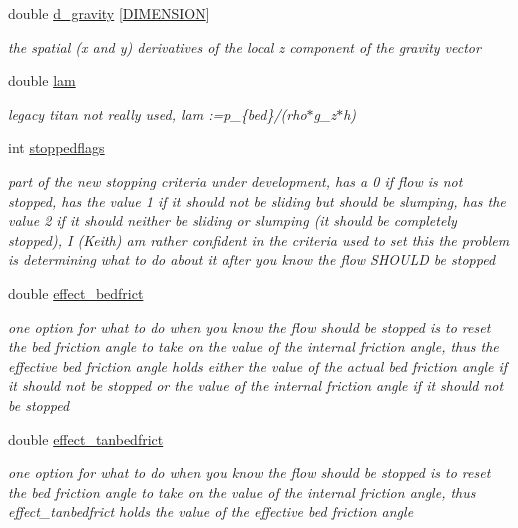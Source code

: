 \begin{CompactItemize}
double \hyperlink{classElement_r41}{d\_\-gravity} \mbox{[}\hyperlink{constant_8h_a15}{DIMENSION}\mbox{]}
\begin{CompactList}\small\item\em the spatial (x and y) derivatives of the local z component of the gravity vector \item\end{CompactList}\item 
double \hyperlink{classElement_r42}{lam}
\begin{CompactList}\small\item\em legacy titan not really used, lam :=p\_\-\{bed\}/(rho$\ast$g\_\-z$\ast$h) \item\end{CompactList}\item 
int \hyperlink{classElement_r43}{stoppedflags}
\begin{CompactList}\small\item\em part of the new stopping criteria under development, has a 0 if flow is not stopped, has the value 1 if it should not be sliding but should be slumping, has the value 2 if it should neither be sliding or slumping (it should be completely stopped), I (Keith) am rather confident in the criteria used to set this the problem is determining what to do about it after you know the flow SHOULD be stopped \item\end{CompactList}\item 
double \hyperlink{classElement_r44}{effect\_\-bedfrict}
\begin{CompactList}\small\item\em one option for what to do when you know the flow should be stopped is to reset the bed friction angle to take on the value of the internal friction angle, thus the effective bed friction angle holds either the value of the actual bed friction angle if it should not be stopped or the value of the internal friction angle if it should not be stopped \item\end{CompactList}\item 
double \hyperlink{classElement_r45}{effect\_\-tanbedfrict}
\begin{CompactList}\small\item\em one option for what to do when you know the flow should be stopped is to reset the bed friction angle to take on the value of the internal friction angle, thus effect\_\-tanbedfrict holds the value of the effective bed friction angle \item\end{CompactList}\item 

\end{CompactItemize}
